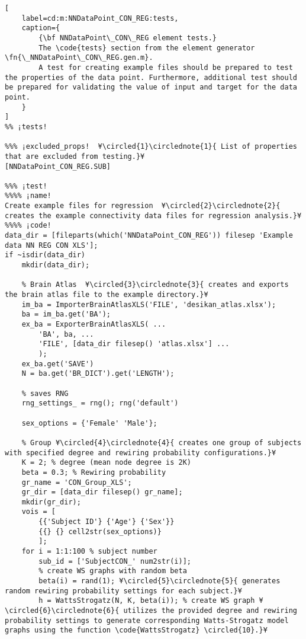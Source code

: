\documentclass{tufte-handout}
\begin{document}
\begin{lstlisting}[
	label=cd:m:NNDataPoint_CON_REG:tests,
	caption={
		{\bf NNDataPoint\_CON\_REG element tests.}
		The \code{tests} section from the element generator \fn{\_NNDataPoint\_CON\_REG.gen.m}.
		A test for creating example files should be prepared to test the properties of the data point. Furthermore, additional test should be prepared for validating the value of input and target for the data point.
	}
]			
%% ¡tests!

%%% ¡excluded_props!  ¥\circled{1}\circlednote{1}{ List of properties that are excluded from testing.}¥
[NNDataPoint_CON_REG.SUB]

%%% ¡test!
%%%% ¡name!
Create example files for regression  ¥\circled{2}\circlednote{2}{ creates the example connectivity data files for regression analysis.}¥
%%%% ¡code!
data_dir = [fileparts(which('NNDataPoint_CON_REG')) filesep 'Example data NN REG CON XLS'];
if ~isdir(data_dir)
    mkdir(data_dir);

    % Brain Atlas  ¥\circled{3}\circlednote{3}{ creates and exports the brain atlas file to the example directory.}¥
    im_ba = ImporterBrainAtlasXLS('FILE', 'desikan_atlas.xlsx');
    ba = im_ba.get('BA');
    ex_ba = ExporterBrainAtlasXLS( ...
        'BA', ba, ...
        'FILE', [data_dir filesep() 'atlas.xlsx'] ...
        );
    ex_ba.get('SAVE')
    N = ba.get('BR_DICT').get('LENGTH');

    % saves RNG
    rng_settings_ = rng(); rng('default')

    sex_options = {'Female' 'Male'};

    % Group ¥\circled{4}\circlednote{4}{ creates one group of subjects with specified degree and rewiring probability configurations.}¥
    K = 2; % degree (mean node degree is 2K)
    beta = 0.3; % Rewiring probability
    gr_name = 'CON_Group_XLS';
    gr_dir = [data_dir filesep() gr_name];
    mkdir(gr_dir);
    vois = [
        {{'Subject ID'} {'Age'} {'Sex'}}
        {{} {} cell2str(sex_options)}
        ];
    for i = 1:1:100 % subject number
        sub_id = ['SubjectCON_' num2str(i)];
        % create WS graphs with random beta
        beta(i) = rand(1); ¥\circled{5}\circlednote{5}{ generates random rewiring probability settings for each subject.}¥
        h = WattsStrogatz(N, K, beta(i)); % create WS graph ¥\circled{6}\circlednote{6}{ utilizes the provided degree and rewiring probability settings to generate corresponding Watts-Strogatz model graphs using the function \code{WattsStrogatz} \circled{10}.}¥


\end{lstlisting}
\end{document}
